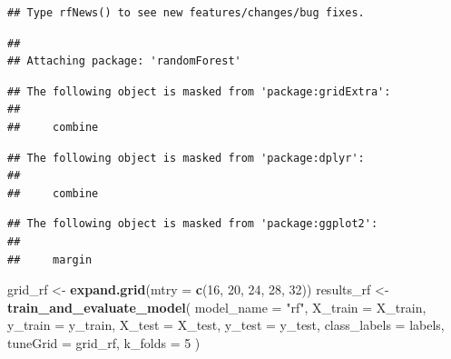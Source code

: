 \documentclass[
]{article}
\newenvironment{Shaded}{\begin{snugshade}}{\end{snugshade}}
\newcommand{\AttributeTok}[1]{\textcolor[rgb]{0.13,0.29,0.53}{#1}}
\newcommand{\DecValTok}[1]{\textcolor[rgb]{0.00,0.00,0.81}{#1}}
\newcommand{\FunctionTok}[1]{\textcolor[rgb]{0.13,0.29,0.53}{\textbf{#1}}}
\newcommand{\NormalTok}[1]{#1}
\newcommand{\OtherTok}[1]{\textcolor[rgb]{0.56,0.35,0.01}{#1}}
\newcommand{\StringTok}[1]{\textcolor[rgb]{0.31,0.60,0.02}{#1}}
\begin{document}
\begin{verbatim}
## Type rfNews() to see new features/changes/bug fixes.
\end{verbatim}

\begin{verbatim}
## 
## Attaching package: 'randomForest'
\end{verbatim}

\begin{verbatim}
## The following object is masked from 'package:gridExtra':
## 
##     combine
\end{verbatim}

\begin{verbatim}
## The following object is masked from 'package:dplyr':
## 
##     combine
\end{verbatim}

\begin{verbatim}
## The following object is masked from 'package:ggplot2':
## 
##     margin
\end{verbatim}

\begin{Shaded}
\begin{Highlighting}[]
\NormalTok{grid\_rf }\OtherTok{\textless{}{-}} \FunctionTok{expand.grid}\NormalTok{(}\AttributeTok{mtry =} \FunctionTok{c}\NormalTok{(}\DecValTok{16}\NormalTok{, }\DecValTok{20}\NormalTok{, }\DecValTok{24}\NormalTok{, }\DecValTok{28}\NormalTok{, }\DecValTok{32}\NormalTok{))}
\NormalTok{results\_rf }\OtherTok{\textless{}{-}} \FunctionTok{train\_and\_evaluate\_model}\NormalTok{(}
  \AttributeTok{model\_name =} \StringTok{"rf"}\NormalTok{,}
  \AttributeTok{X\_train =}\NormalTok{ X\_train,}
  \AttributeTok{y\_train =}\NormalTok{ y\_train,}
  \AttributeTok{X\_test =}\NormalTok{ X\_test,}
  \AttributeTok{y\_test =}\NormalTok{ y\_test,}
  \AttributeTok{class\_labels =}\NormalTok{ labels,}
  \AttributeTok{tuneGrid =}\NormalTok{ grid\_rf,}
  \AttributeTok{k\_folds =} \DecValTok{5}
\NormalTok{)}
\end{Highlighting}
\end{Shaded}
\end{document}
